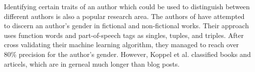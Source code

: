 Identifying certain traits of an author which could be used to distinguish between different authors is also a popular research area.
The authors of \cite{koppel2003automatically} have attempted to discern an author's gender in fictional and non-fictional works.
Their approach uses function words and part-of-speech tags as singles, tuples, and triples.
After cross validating their machine learning algorithm, they managed to reach over 80\% precision for the author's gender.
However, Koppel et al. classified books and articels, which are in gerneal much longer than blog posts.